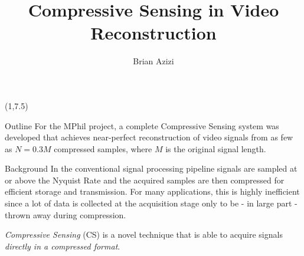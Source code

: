 \documentclass[final]{beamer}
\title{Compressive Sensing in Video Reconstruction}
\author{Brian Azizi}
\begin{document}
\begin{frame}{} 

\begin{textblock}{19.5}(1,7.5)
\begin{block}{Outline}
For the MPhil project, a complete Compressive Sensing system was developed that achieves near-perfect reconstruction of video signals from as few as $N = 0.3M$ compressed samples, where $M$ is the original signal length.
\end{block}

\begin{block}{Background}
In the conventional signal processing pipeline signals are sampled at or above the Nyquist Rate and the acquired samples are then compressed for efficient storage and transmission.
For many applications, this is highly inefficient since a lot of data is collected at the acquisition stage only to be - in large part - thrown away during compression.

\emph{Compressive Sensing} (CS) \cite{candes2006,donoho2006} is a novel technique that is able to acquire signals \emph{directly in a compressed format}.




\end{block}




\end{textblock}
\end{frame}
\end{document}
